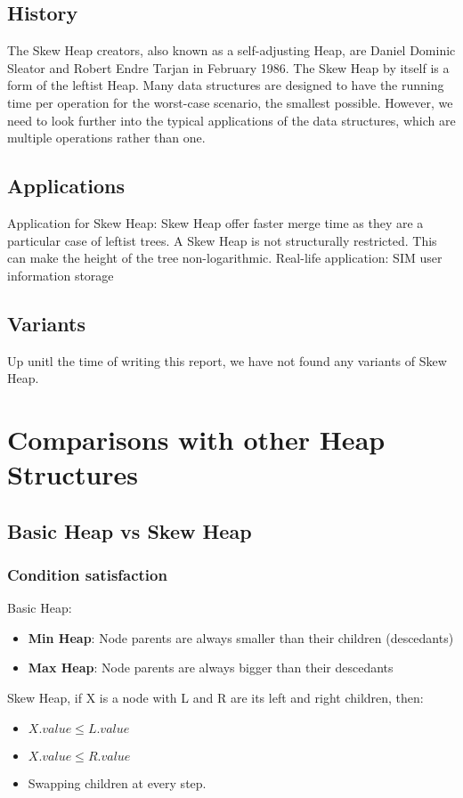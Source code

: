 \documentclass[12pt, a4paper]{article}
\begin{document}
\subsection{History}
The Skew Heap creators, also known as a self-adjusting Heap, are Daniel Dominic Sleator and Robert Endre Tarjan in February 1986.
The Skew Heap by itself is a form of the leftist Heap.
Many data structures are designed to have the running time per operation for the worst-case scenario, the smallest possible.
However, we need to look further into the typical applications of the data structures, which are multiple operations rather than one.

\subsection{Applications}
Application for Skew Heap: Skew Heap offer faster merge time as they are a particular case of leftist trees.
A Skew Heap is not structurally restricted. This can make the height of the tree non-logarithmic.
Real-life application: SIM user information storage

\subsection{Variants}
Up unitl the time of writing this report, we have not found any variants of Skew Heap.


\pagebreak

\section{Comparisons with other Heap Structures}
\subsection{Basic Heap vs Skew Heap}
\subsubsection{Condition satisfaction}
Basic Heap:
\begin{itemize}
    \item \textbf{Min Heap}: Node parents are always smaller than their children (descedants)
    \item \textbf{Max Heap}: Node parents are always bigger than their descedants
\end{itemize}
Skew Heap, if X is a node with L and R are its left and right children, then:
\begin{itemize}
    \item $ X.value \leq L.value $
    \item $ X.value \leq R.value $
    \item Swapping children at every step.
\end{itemize}
\end{document}
